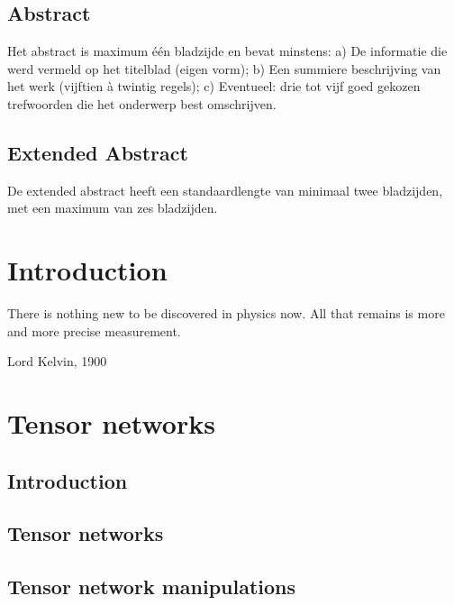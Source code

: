 \documentclass{book}
\newcounter{a}
\newcounter{b}
\begin{document}


\section*{Abstract}

Het abstract is maximum één bladzijde en bevat minstens:
a) De informatie die werd vermeld op het titelblad (eigen vorm);
b) Een summiere beschrijving van het werk (vijftien à twintig regels);
c) Eventueel: drie tot vijf goed gekozen trefwoorden die het onderwerp best
omschrijven.


\section*{Extended Abstract}

De extended abstract heeft een standaardlengte van minimaal twee bladzijden, met een maximum van zes bladzijden.

\tableofcontents


\mainmatter


\chapter{Introduction}

\epigraph{There is nothing new to be discovered in physics now. All that remains is more and more precise measurement.}{Lord Kelvin, 1900}



\chapter{Tensor networks}

\section{Introduction}


\section{Tensor networks}


\section{Tensor network manipulations}\label{sec:mpomath}

\end{document}
